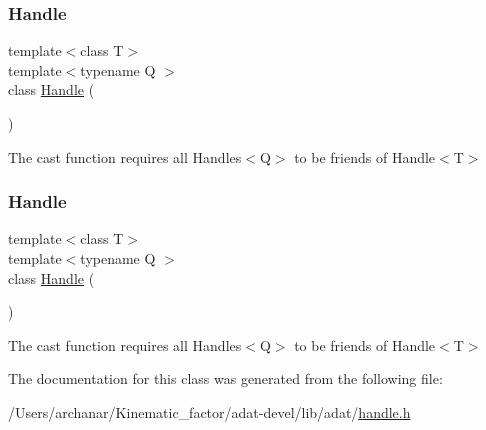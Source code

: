 \mbox{\label{classADAT_1_1Handle_a7b22116ca951d48056220c7ad9620e85}} 
\subsubsection{\texorpdfstring{Handle}{Handle}\hspace{0.1cm}{\footnotesize\ttfamily [2/3]}}
{\footnotesize\ttfamily template$<$class T$>$ \\
template$<$typename Q $>$ \\
class \mbox{\hyperlink{classADAT_1_1Handle}{Handle}} (\begin{DoxyParamCaption}{ }\end{DoxyParamCaption})\hspace{0.3cm}{\ttfamily [friend]}}



The cast function requires all Handles$<$\+Q$>$ to be friends of Handle$<$\+T$>$ 

\mbox{\label{classADAT_1_1Handle_a7b22116ca951d48056220c7ad9620e85}} 
\subsubsection{\texorpdfstring{Handle}{Handle}\hspace{0.1cm}{\footnotesize\ttfamily [3/3]}}
{\footnotesize\ttfamily template$<$class T$>$ \\
template$<$typename Q $>$ \\
class \mbox{\hyperlink{classADAT_1_1Handle}{Handle}} (\begin{DoxyParamCaption}{ }\end{DoxyParamCaption})\hspace{0.3cm}{\ttfamily [friend]}}



The cast function requires all Handles$<$\+Q$>$ to be friends of Handle$<$\+T$>$ 



The documentation for this class was generated from the following file\+:\begin{DoxyCompactItemize}
\item 
/\+Users/archanar/\+Kinematic\+\_\+factor/adat-\/devel/lib/adat/\mbox{\hyperlink{adat-devel_2lib_2adat_2handle_8h}{handle.\+h}}\end{DoxyCompactItemize}
